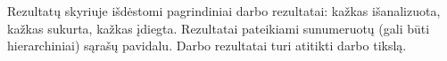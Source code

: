 Rezultatų skyriuje išdėstomi  pagrindiniai  darbo  rezultatai: kažkas  išanalizuota,
kažkas sukurta, kažkas įdiegta. Rezultatai pateikiami sunumeruotų (gali būti
hierarchiniai) sąrašų pavidalu. Darbo rezultatai turi atitikti darbo tikslą.